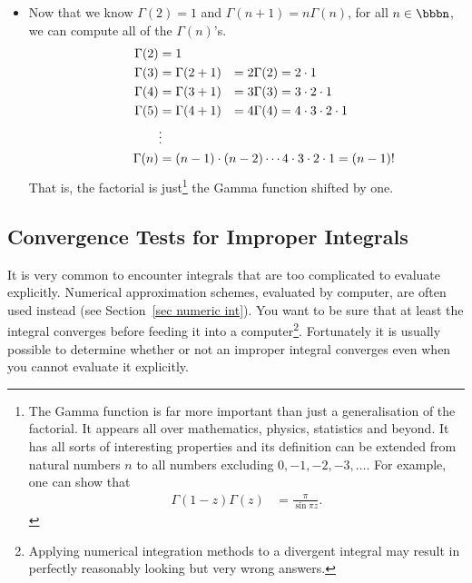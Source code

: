 \begin{eg}
\begin{itemize}
\item Now that we know $\Gamma(2)=1$ and $\Gamma(n+1)= n\Gamma(n)$, for all
$n\in\bbbn$, we can compute all of the $\Gamma(n)$'s.
\begin{alignat*}{4}
\Gamma(2)&=1 \\
\Gamma(3)&=\Gamma(2+1)&=2\Gamma(2)&=2\cdot 1 \\
\Gamma(4)&=\Gamma(3+1)&=3\Gamma(3)&=3\cdot2\cdot 1 \\
\Gamma(5)&=\Gamma(4+1)&=4\Gamma(4)&=4\cdot3\cdot 2\cdot 1 \\
         &\vdots\\
\Gamma(n)&=(n-1)\cdot(n-2)\cdots 4\cdot 3\cdot 2\cdot 1 = (n-1)!\hidewidth
\end{alignat*}
That is, the factorial is just\footnote{The Gamma function is far more
important than just a generalisation of the factorial. It appears all over
mathematics, physics, statistics and beyond. It has all sorts of interesting
properties and its definition can be extended from natural numbers $n$ to all
numbers excluding $0,-1,-2,-3,\dots$. For example, one can show that
\begin{align*}
  \Gamma(1-z)\Gamma(z) &= \frac{\pi}{\sin \pi z}.
\end{align*}
 } the Gamma function shifted by one.
\end{itemize}
\end{eg}

\subsection{Convergence Tests for Improper Integrals}
It is very common to encounter integrals that are too complicated to
evaluate explicitly. Numerical approximation schemes, evaluated by computer, are
often used instead (see Section~\ref{sec numeric int}). You want to be sure that
at least the integral converges before feeding it into a
computer\footnote{Applying numerical integration methods to a divergent integral
may result in perfectly reasonably looking but very wrong answers.}. Fortunately
it is usually possible to determine whether or not an improper integral
converges even when you cannot evaluate it explicitly.

